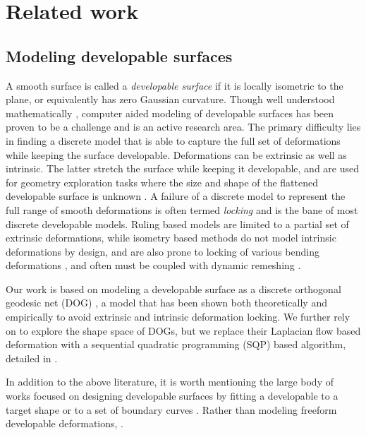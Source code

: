
\section{Related work}
\subsection{Modeling developable surfaces}
A smooth surface is called a \textit{developable surface} if it is locally isometric to the plane, or equivalently has zero Gaussian curvature. Though well understood mathematically \cite{do_carmo,spivak,computational_line}, computer aided modeling of developable surfaces has been proven to be a challenge and is an active research area. The primary difficulty lies in finding a discrete model that is able to capture the full set of deformations while keeping the surface developable. Deformations can be extrinsic as well as intrinsic. The latter stretch the surface while keeping it developable, and are used for geometry exploration tasks where the size and shape of the flattened developable surface is unknown \cite{conical,pottmann_new,rabi2018shape}. A failure of a discrete model to represent the full range of smooth deformations is often termed \emph{locking} \cite{solomon,locking1} and is the bane of most discrete developable models. Ruling based models \cite{conical,curved_folding_kilian,pottmann_new,stein_dev,solomon} are limited to a partial set of extrinsic deformations, while isometry based methods \cite{grin_shells,shells, goldenthal2007efficient,froh_botsch} do not model intrinsic deformations by design, and are also prone to locking of various bending deformations \cite{locking1,locking2}, and often must be coupled with dynamic remeshing \cite{narain2012adaptive,StringActuated:2017,Narain,SchreckEG2017}.  

Our work is based on modeling a developable surface as a discrete orthogonal geodesic net (DOG) \cite{rabi18}, a model that has been shown both theoretically and empirically to avoid extrinsic and intrinsic deformation locking. 
We further rely on \cite{rabi2018shape} to explore the shape space of DOGs, but we replace their Laplacian flow based deformation with a sequential quadratic programming (SQP) based algorithm, detailed in . 

In addition to the above literature, it is worth mentioning the large body of works focused on designing developable surfaces by fitting a developable to a target shape \cite{pottmann_approx,pottmann_new,stein_dev} or to a set of boundary curves \cite{sheffer,Frey1,Frey2,bo2019multi}. Rather than modeling freeform developable deformations, . 

